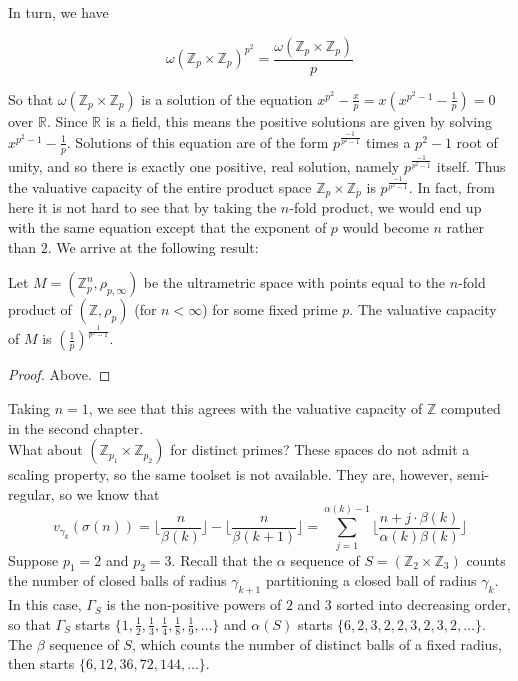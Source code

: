 In turn, we have 

\[ \omega(\mathbb{Z}_p \times \mathbb{Z}_p)^{p^2} =  \frac{\omega(\mathbb{Z}_p \times \mathbb{Z}_p)}{p}  \]

So that $\omega(\mathbb{Z}_p \times \mathbb{Z}_p)$ is a solution of the equation $x^{p^2} - \frac{x}{p} = x(x^{p^2-1} - \frac{1}{p})=0$ over $\mathbb{R}$. Since $\mathbb{R}$ is a field, this means the positive solutions are given by solving $x^{p^2-1}-\frac{1}{p}$. Solutions of this equation are of the form $p^{\frac{-1}{p^2-1}}$ times a $p^2-1$ root of unity, and so there is exactly one positive, real solution, namely $p^{\frac{-1}{p^2-1}}$ itself. Thus the valuative capacity of the entire product space $\mathbb{Z}_p \times \mathbb{Z}_p$ is $p^{\frac{-1}{p^2-1}}$. In fact, from here it is not hard to see that by taking the $n$-fold product, we would end up with the same equation except that the exponent of $p$ would become $n$ rather than $2$. We arrive at the following result:\\

\begin{proposition}
Let $M=(\mathbb{Z}_p^n, \rho_{p, \infty})$ be the ultrametric space with points equal to the $n$-fold product of $(\mathbb{Z}, \rho_p)$ (for $n < \infty$) for some fixed prime $p$. The valuative capacity of $M$ is  $(\frac{1}{p})^{\frac{1}{p^n-1}}$.
\end{proposition}

\begin{proof}
Above.
\end{proof}

Taking $n=1$, we see that this agrees with the valuative capacity of $\mathbb{Z}$ computed in the second chapter. \\

What about $(\mathbb{Z}_{p_1} \times \mathbb{Z}_{p_2})$ for distinct primes? These spaces do not admit a scaling property, so the same toolset is not available. They are, however, semi-regular, so we know that\\  \[v_{\gamma_k}(\sigma(n)) =  \lfloor\frac{n}{\beta(k)}\rfloor - \lfloor\frac{n}{\beta(k+1)}\rfloor = \sum_{j=1}^{\alpha(k)-1} \lfloor \frac{n + j\cdot \beta(k)}{\alpha(k)\beta(k)} \rfloor \]
Suppose $p_1 =2$ and $p_2 =3$. Recall that the $\alpha$ sequence of $S=(\mathbb{Z}_{2} \times \mathbb{Z}_{3})$ counts the number of closed balls of radius $\gamma_{k+1}$ partitioning a closed ball of radius $\gamma_k$. In this case, $\Gamma_S$ is the non-positive powers of $2$ and $3$ sorted into decreasing order, so that $\Gamma_S$ starts $\{1, \frac{1}{2},\frac{1}{3},\frac{1}{4},\frac{1}{8},\frac{1}{9},\ldots \}$ and $\alpha(S)$ starts $\{6,2,3,2,2,3,2,3,2,\ldots\}$. The $\beta$ sequence of $S$, which counts the number of distinct balls of a fixed radius, then starts $\{6,12,36,72,144,\ldots\}$.\\

